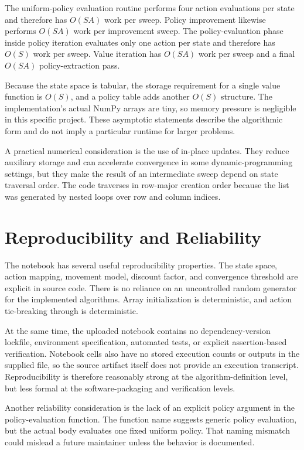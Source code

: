 \documentclass[11pt,a4paper]{article}
\newcommand{\code}[1]{\texttt{\detokenize{#1}}}
\begin{document}
The uniform-policy evaluation routine performs four action evaluations per state and therefore has \(O(SA)\) work per sweep. Policy improvement likewise performs \(O(SA)\) work per improvement sweep. The policy-evaluation phase inside policy iteration evaluates only one action per state and therefore has \(O(S)\) work per sweep. Value iteration has \(O(SA)\) work per sweep and a final \(O(SA)\) policy-extraction pass.

Because the state space is tabular, the storage requirement for a single value function is \(O(S)\), and a policy table adds another \(O(S)\) structure. The implementation's actual NumPy arrays are tiny, so memory pressure is negligible in this specific project. These asymptotic statements describe the algorithmic form and do not imply a particular runtime for larger problems.

A practical numerical consideration is the use of in-place updates. They reduce auxiliary storage and can accelerate convergence in some dynamic-programming settings, but they make the result of an intermediate sweep depend on state traversal order. The code traverses \code{states} in row-major creation order because the list was generated by nested loops over row and column indices.

\section{Reproducibility and Reliability}
The notebook has several useful reproducibility properties. The state space, action mapping, movement model, discount factor, and convergence threshold are explicit in source code. There is no reliance on an uncontrolled random generator for the implemented algorithms. Array initialization is deterministic, and action tie-breaking through \code{np.argmax} is deterministic.

At the same time, the uploaded notebook contains no dependency-version lockfile, environment specification, automated tests, or explicit assertion-based verification. Notebook cells also have no stored execution counts or outputs in the supplied file, so the source artifact itself does not provide an execution transcript. Reproducibility is therefore reasonably strong at the algorithm-definition level, but less formal at the software-packaging and verification levels.

Another reliability consideration is the lack of an explicit policy argument in the policy-evaluation function. The function name suggests generic policy evaluation, but the actual body evaluates one fixed uniform policy. That naming mismatch could mislead a future maintainer unless the behavior is documented.
\end{document}
